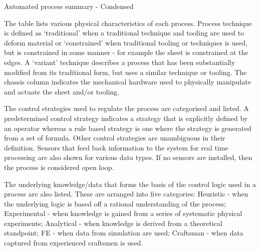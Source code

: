 \newpage



\newpage
\begin{table}[h] 
    \centering
    \resizebox{\linewidth}{!}{
        
        }
    \caption{Automated process summary - Condensed }
    \label{tab:MechProcesses}
\end{table}

The table lists various physical characteristics of each process. Process technique is defined as `traditional' when a traditional technique and tooling are used to deform material or `constrained' when traditional tooling or techniques is used, but is constrained in some manner - for example the sheet is constrained at the edges. A `variant' technique describes a process that has been substantially modified from its traditional form, but uses a similar technique or tooling. The chassis column indicates the mechanical hardware used to physically manipulate and actuate the sheet and/or tooling. 




The control strategies used to regulate the process are categorised and listed. A predetermined control strategy indicates a strategy that is explicitly defined by an operator whereas a rule based strategy is one where the strategy is generated from a set of formula. Other control strategies are unambiguous in their definition. Sensors that feed back information to the system for real time processing are also shown for various data types. If no sensors are installed, then the process is considered open loop.


The underlying knowledge/data that forms the basis of the control logic used in a process are also listed. These are arranged into five categories: Heuristic - when the underlying logic is based off a rational understanding of the process; Experimental - when knowledge is gained from a series of systematic physical experiments; Analytical - when knowledge is derived from a theoretical standpoint; FE - when data from simulation are used; Craftsman - when data captured from experienced craftsmen is used.

